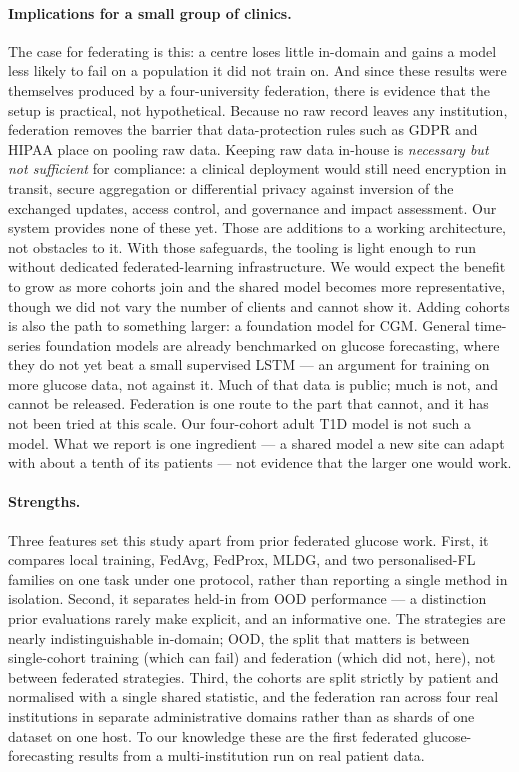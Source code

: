 \documentclass[10pt,letterpaper]{article}
\begin{document}
\paragraph{Implications for a small group of clinics.} The case for
federating is this: a centre loses little in-domain and gains a model less
likely to fail on a population it did not train on. And since these results were themselves produced by a
four-university federation, there is evidence that the setup is practical,
not hypothetical. Because no raw record leaves any institution, federation
removes the barrier that data-protection rules such as GDPR and HIPAA place
on pooling raw data. Keeping raw data in-house is \emph{necessary but not
sufficient} for compliance: a clinical deployment would still need encryption
in transit, secure aggregation or differential privacy against inversion of
the exchanged updates, access control, and governance and impact assessment.
Our system provides none of these yet. Those are additions to a working
architecture, not obstacles to it. With those safeguards, the tooling is
light enough to run without dedicated federated-learning infrastructure. We
would expect the benefit to grow as more cohorts join and the shared model
becomes more representative, though we did not vary the number of clients and
cannot show it. Adding cohorts is also the path to something larger: a
foundation model for CGM. General time-series foundation models are already
benchmarked on glucose forecasting, where they do not yet beat a small
supervised LSTM \cite{lu2026glucofmbench} --- an argument for training on
more glucose data, not against it. Much of that data is public; much is not,
and cannot be released. Federation is one route to the part that cannot, and
it has not been tried at this scale. Our four-cohort adult T1D model is not
such a model. What we report is one ingredient --- a shared model a new site
can adapt with about a tenth of its patients --- not evidence that the larger
one would work.

\paragraph{Strengths.} Three features set this study apart from prior
federated glucose work. First, it compares local training, FedAvg, FedProx,
MLDG, and two personalised-FL families on one task under one protocol, rather
than reporting a single method in isolation. Second, it separates held-in
from OOD performance --- a distinction prior evaluations rarely make
explicit, and an informative one. The strategies are nearly indistinguishable
in-domain; OOD, the split that matters is between single-cohort training
(which can fail) and federation (which did not, here), not between federated
strategies. Third, the cohorts are split strictly by patient and normalised
with a single shared statistic, and the federation ran across four real
institutions in separate administrative domains rather than as shards of one
dataset on one host. To our knowledge these are the first federated
glucose-forecasting results from a multi-institution run on real patient data.
\end{document}
